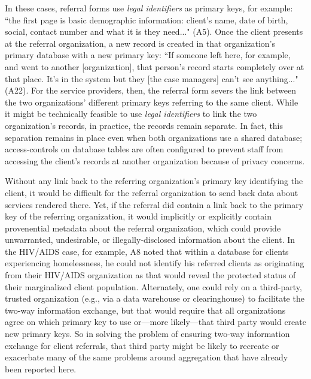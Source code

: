 In these cases, referral forms use \textit{legal identifiers} as primary keys, for example: ``the first page is basic demographic information: client's name, date of birth, social, contact number and what it is they need..." (A5). Once the client presents at the referral organization, a new record is created in that organization's primary database with a new primary key: ``If someone left here, for example, and went to another [organization], that person's record starts completely over at that place. It's in the system but they [the case managers] can't see anything..." (A22). For the service providers, then, the referral form severs the link between the two organizations' different primary keys referring to the same client. While it might be technically feasible to use \textit{legal identifiers} to link the two organization's records, in practice, the records remain separate. In fact, this separation remains in place even when both organizations use a shared database; access-controls on database tables are often configured to prevent staff from accessing the client's records at another organization because of privacy concerns. 

Without any link back to the referring organization's primary key identifying the client, it would be difficult for the referral organization to send back data about services rendered there. Yet, if the referral did contain a link back to the primary key of the referring organization, it would implicitly or explicitly contain provenential metadata about the referral organization, which could provide unwarranted, undesirable, or illegally-disclosed information about the client. In the HIV/AIDS case, for example, A8 noted that within a database for clients experiencing homelessness, he could not identify his referred clients as originating from their HIV/AIDS organization as that would reveal the protected status of their marginalized client population. Alternately, one could rely on a third-party, trusted organization (e.g., via a data warehouse or clearinghouse) to facilitate the two-way information exchange, but that would require that all organizations agree on which primary key to use or---more likely---that third party would create new primary keys. So in solving the problem of ensuring two-way information exchange for client referrals, that third party might be likely to recreate or exacerbate many of the same problems around aggregation that have already been reported here. 

